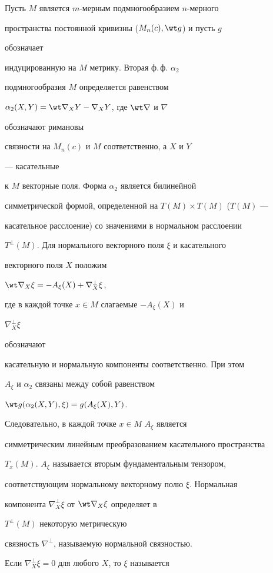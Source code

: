Пусть $M$ является $m$-мерным подмногообразием $n$-мерного


пространства постоянной кривизны ($M_n(c),\wt g$) и пусть $g$


обозначает


индуцированную на $M$ метрику. Вторая ф.\,ф. $\alpha_2$


подмногообразия $M$ определяется равенством


$\alpha_2(X,Y)=\wt\nabla_X Y-\nabla_X Y$, где $\wt\nabla$ и $\nabla$


обозначают римановы


связности на $M_n(c)$ и $M$ соответственно, а $X$ и $Y$


--- касательные


к $M$ векторные поля. Форма $\alpha_2$ является билинейной


симметрической формой, определенной на $T(M)\times T(M)$ ($T(M)$ ---


касательное расслоение) со значениями в нормальном расслоении


$T^\bot(M)$. Для нормального векторного поля $\xi$ и касательного


векторного поля $X$ положим


$\wt\nabla_X\xi=-A_\xi(X)+\nabla^\bot_X\xi$,


где в каждой точке $x\in M$ слагаемые $-A_\xi(X)$ и


$\nabla^\bot_X\xi$


обозначают


касательную и нормальную компоненты соответственно. При этом


$A_\xi$ и $\alpha_2$ связаны между собой равенством


$\wt g(\alpha_2(X,Y),\xi)=g(A_\xi(X),Y)$.


Следовательно, в каждой точке $x\in M$\; $A_\xi$ является


симметрическим линейным преобразованием касательного пространства


$T_x(M)$.\; $A_\xi$ называется вторым фундаментальным тензором,


соответствующим нормальному векторному полю $\xi$. Нормальная


компонента $\nabla^\bot_X\xi$ от $\wt\nabla_X\xi$ определяет в


$T^\bot(M)$ некоторую метрическую


связность $\nabla^\bot$, называемую нормальной связностью.


Если $\nabla^\bot_X\xi=0$ для любого $X$, то $\xi$ называется


